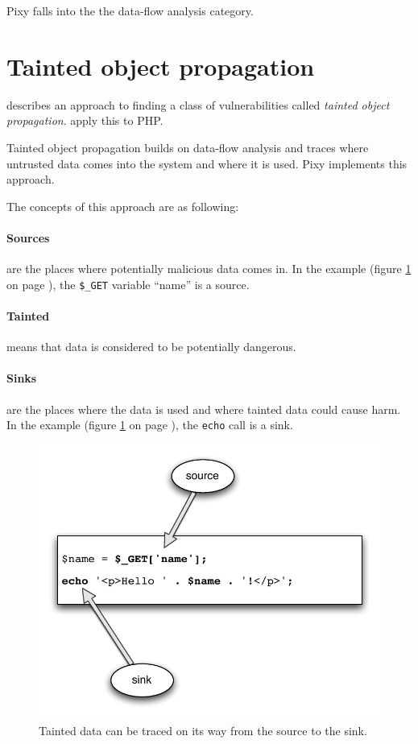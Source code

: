 Pixy falls into the the data-flow analysis category.

\section{Tainted object propagation}
\label{tainting}
\cite{finding-security-vulnerabilities} describes an approach to finding a class of vulnerabilities called \emph{tainted object propagation}. \cite{pixy-short, pixy-long, pixy-dissertation} apply this to PHP.

Tainted object propagation builds on data-flow analysis and traces where untrusted data comes into the system and where it is used. Pixy implements this approach.

The concepts of this approach are as following:
\paragraph{Sources} are the places where potentially malicious data comes in. In the example (figure \ref{fig:taint} on page \pageref{fig:taint}), the \texttt{\$\_GET} variable ``name'' is a source.
\paragraph{Tainted} means that data is considered to be potentially dangerous.
\paragraph{Sinks} are the places where the data is used and where tainted data could cause harm. In the example (figure \ref{fig:taint} on page \pageref{fig:taint}), the \texttt{echo} call is a sink.

\begin{figure}[!h]
  \includegraphics[scale=0.8]{images/taint}
  \caption{Tainted data can be traced on its way from the source to the sink.}
  \label{fig:taint}
\end{figure}

